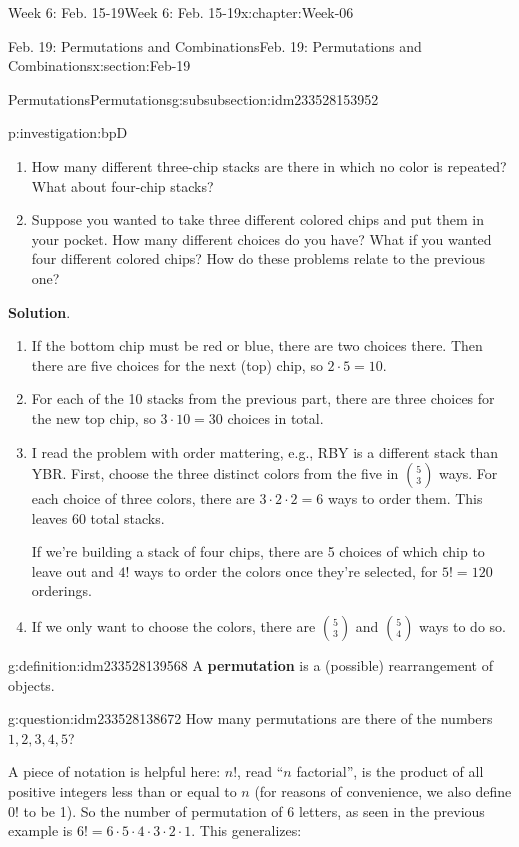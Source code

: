 \documentclass[oneside,10pt,]{book}
\newcommand{\blocktitlefont}{\relax}
\newcommand{\terminology}[1]{\textbf{#1}}
\numberwithin{equation}{section}
\begin{document}
\begin{chapterptx}{Week 6: Feb. 15-19}{}{Week 6: Feb. 15-19}{}{}{x:chapter:Week-06}
\begin{sectionptx}{Feb. 19: Permutations and Combinations}{}{Feb. 19: Permutations and Combinations}{}{}{x:section:Feb-19}
\begin{subsubsectionptx}{Permutations}{}{Permutations}{}{}{g:subsubsection:idm233528153952}
\begin{investigation}{}{p:investigation:bpD}
\begin{enumerate}
\item{}How many different three-chip stacks are there in which no color is repeated? What about four-chip stacks?%
\item{}Suppose you wanted to take three different colored chips and put them in your pocket. How many different choices do you have? What if you wanted four different colored chips? How do these problems relate to the previous one?%
\end{enumerate}
%
\par\smallskip%
\noindent\textbf{\blocktitlefont Solution}.\hypertarget{g:solution:idm233528145424}{}\quad{}%
\begin{enumerate}
\item{}If the bottom chip must be red or blue, there are two choices there. Then there are five choices for the next (top) chip, so \(2\cdot 5 = 10\).%
\item{}For each of the 10 stacks from the previous part, there are three choices for the new top chip, so \(3\cdot 10 = 30\) choices in total.%
\item{}I read the problem with order mattering, e.g., RBY is a different stack than YBR. First, choose the three distinct colors from the five in \(\binom{5}{3}\) ways. For each choice of three colors, there are \(3\cdot 2\cdot 2 = 6\) ways to order them. This leaves 60 total stacks.%
\par
If we're building a stack of four chips, there are 5 choices of which chip to leave out and \(4!\) ways to order the colors once they're selected, for \(5! = 120\) orderings.%
\item{}If we only want to choose the colors, there are \(\binom{5}{3}\) and \(\binom{5}{4}\) ways to do so.%
\end{enumerate}
\end{investigation}%
\begin{definition}{}{g:definition:idm233528139568}%
A \terminology{permutation} is a (possible) rearrangement of objects.%
\end{definition}
\begin{question}{}{g:question:idm233528138672}%
How many permutations are there of the numbers \(1,2,3,4,5\)?%
\end{question}
A piece of notation is helpful here: \(n!\), read ``\(n\) factorial'',  is the product of all positive integers less than or equal to \(n\) (for reasons of convenience, we also define 0! to be 1). So the number of permutation of 6 letters, as seen in the previous example is \(6! = 6\cdot 5 \cdot 4 \cdot 3 \cdot 2 \cdot 1\). This generalizes:%

\end{subsubsectionptx}
\end{sectionptx}
\end{chapterptx}
\end{document}
